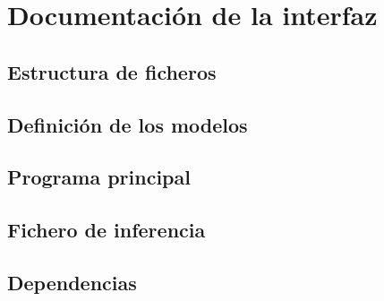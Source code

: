 \chapter{Documentación de la interfaz}

\section{Estructura de ficheros}

\section{Definición de los modelos}

\section{Programa principal}

\section{Fichero de inferencia}

\section{Dependencias}